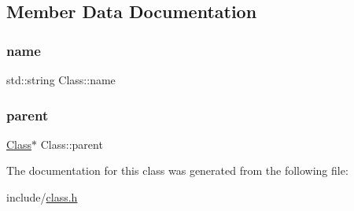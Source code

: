 \subsection{Member Data Documentation}
\mbox{\label{classClass_aac209ee2e03afc3bc9e93fd1fd46256b}} 
\subsubsection{\texorpdfstring{name}{name}}
{\footnotesize\ttfamily std\+::string Class\+::name}

\mbox{\label{classClass_a1f94bc39c04d18b5c4421862f8506d1d}} 
\subsubsection{\texorpdfstring{parent}{parent}}
{\footnotesize\ttfamily \hyperlink{classClass}{Class}$\ast$ Class\+::parent}



The documentation for this class was generated from the following file\+:\begin{DoxyCompactItemize}
\item 
include/\hyperlink{class_8h}{class.\+h}\end{DoxyCompactItemize}
